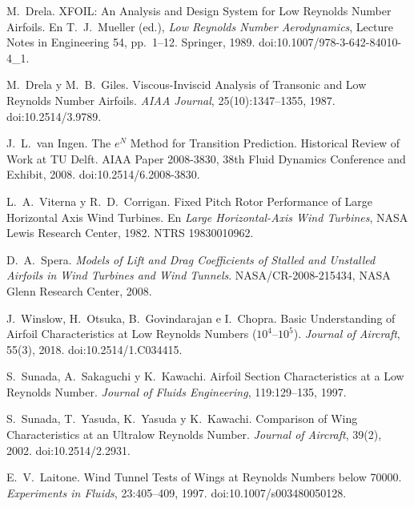  M.~Drela. XFOIL: An Analysis and Design System for Low
  Reynolds Number Airfoils. En T.~J.~Mueller (ed.), \emph{Low Reynolds Number
  Aerodynamics}, Lecture Notes in Engineering 54, pp.~1--12. Springer, 1989.
  doi:10.1007/978-3-642-84010-4\_1.

 M.~Drela y M.~B.~Giles. Viscous-Inviscid Analysis of
  Transonic and Low Reynolds Number Airfoils. \emph{AIAA Journal}, 25(10):1347--1355,
  1987. doi:10.2514/3.9789.

 J.~L.~van Ingen. The $e^N$ Method for Transition
  Prediction. Historical Review of Work at TU Delft. AIAA Paper 2008-3830, 38th Fluid
  Dynamics Conference and Exhibit, 2008. doi:10.2514/6.2008-3830.

 L.~A.~Viterna y R.~D.~Corrigan. Fixed Pitch Rotor
  Performance of Large Horizontal Axis Wind Turbines. En \emph{Large Horizontal-Axis
  Wind Turbines}, NASA Lewis Research Center, 1982. NTRS 19830010962.

 D.~A.~Spera. \emph{Models of Lift and Drag Coefficients of
  Stalled and Unstalled Airfoils in Wind Turbines and Wind Tunnels}. NASA/CR-2008-215434,
  NASA Glenn Research Center, 2008.

 J.~Winslow, H.~Otsuka, B.~Govindarajan e I.~Chopra. Basic
  Understanding of Airfoil Characteristics at Low Reynolds Numbers ($10^4$--$10^5$).
  \emph{Journal of Aircraft}, 55(3), 2018. doi:10.2514/1.C034415.

 S.~Sunada, A.~Sakaguchi y K.~Kawachi. Airfoil Section
  Characteristics at a Low Reynolds Number. \emph{Journal of Fluids Engineering},
  119:129--135, 1997.

 S.~Sunada, T.~Yasuda, K.~Yasuda y K.~Kawachi. Comparison of
  Wing Characteristics at an Ultralow Reynolds Number. \emph{Journal of Aircraft},
  39(2), 2002. doi:10.2514/2.2931.

 E.~V.~Laitone. Wind Tunnel Tests of Wings at Reynolds
  Numbers below \num{70000}. \emph{Experiments in Fluids}, 23:405--409, 1997.
  doi:10.1007/s003480050128.
